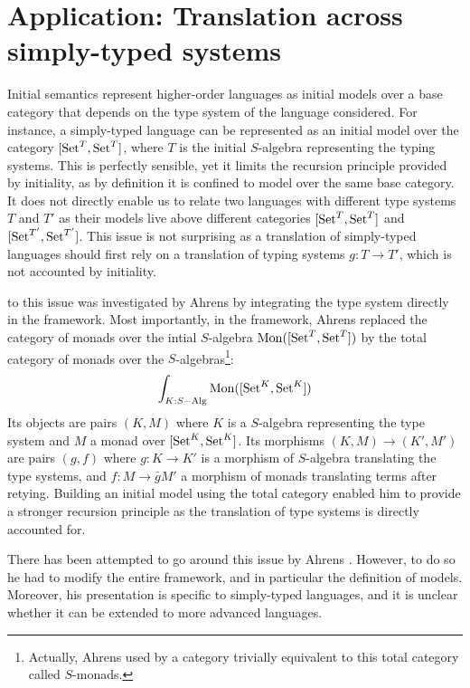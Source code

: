\section{Application: Translation across simply-typed systems}

Initial semantics represent higher-order languages as initial models over a
base category that depends on the type system of the language considered.
For instance, a simply-typed language can be represented as an initial model
over the category $[\operatorname{Set}^T,\operatorname{Set}^T]$, where $T$ is the initial $S$-algebra
representing the typing systems.
This is perfectly sensible, yet it limits the recursion principle provided
by initiality, as by definition it is confined to model over the same base
category.
It does not directly enable us to relate two languages with different type
systems $T$ and $T'$ as their models live above different categories
$[\operatorname{Set}^T,\operatorname{Set}^T]$ and $[\operatorname{Set}^{T'},\operatorname{Set}^{T'}]$.
This issue is not surprising as a translation of simply-typed languages
should first rely on a translation of typing systems $g : T \to T'$,
which is not accounted by initiality.

 to this issue was investigated by Ahrens
\cite{ExtendedInitiality12} by integrating the type system directly in
the framework.
%
Most importantly, in the framework, Ahrens replaced the category of monads
over the intial $S$-algebra $\operatorname{Mon}([\operatorname{Set}^{T},\operatorname{Set}^{T}])$ by the total
category of monads over the $S$-algebras\footnote{
  Actually, Ahrens used by a category trivially equivalent to this total category called $S$-monads.}:
%
\[\int_{K : S-\mathrm{Alg}} \operatorname{Mon}([\operatorname{Set}^K,\operatorname{Set}^K]) \]
%
Its objects are pairs $(K,M)$ where $K$ is a $S$-algebra representing the
type system and $M$ a monad over $[\operatorname{Set}^{K},\operatorname{Set}^{K}]$.
Its morphisms $(K,M) \to (K',M')$ are pairs $(g,f)$ where $g : K \to K'$ is
a morphism of $S$-algebra translating the type systems, and $f : M \to \bar{g}M'$
a morphism of monads translating terms after retying.
Building an initial model using the total category enabled him to provide a
stronger recursion principle as the translation of type systems is directly
accounted for.







There has been attempted to go around this issue by Ahrens \cite{ExtendedInitiality12}.
However, to do so he had to modify the entire framework, and in particular
the definition of models.
Moreover, his presentation is specific to simply-typed languages, and it is
unclear whether it can be extended to more advanced languages.


